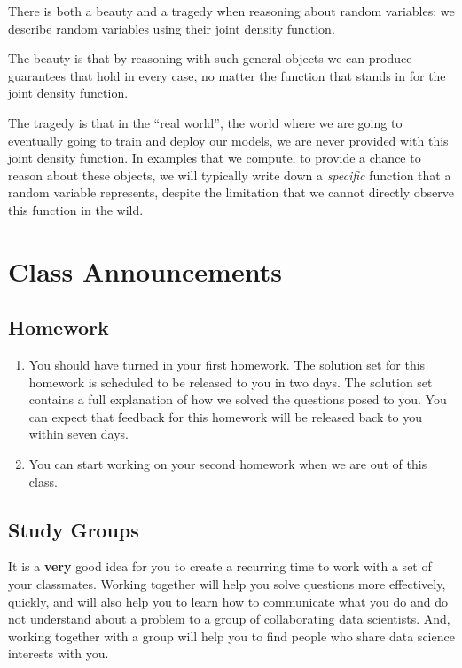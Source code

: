 \documentclass[
]{book}
\providecommand{\tightlist}{%
  \setlength{\itemsep}{0pt}\setlength{\parskip}{0pt}}
\theoremstyle{definition}
\theoremstyle{definition}
\theoremstyle{definition}
\theoremstyle{definition}
\theoremstyle{remark}
\begin{document}
There is both a beauty and a tragedy when reasoning about random variables: we describe random variables using their joint density function.

The beauty is that by reasoning with such general objects we can produce guarantees that hold in every case, no matter the function that stands in for the joint density function.

The tragedy is that in the ``real world'', the world where we are going to eventually going to train and deploy our models, we are never provided with this joint density function. In examples that we compute, to provide a chance to reason about these objects, we will typically write down a \emph{specific} function that a random variable represents, despite the limitation that we cannot directly observe this function in the wild.

\hypertarget{class-announcements}{%
\section{Class Announcements}\label{class-announcements}}

\hypertarget{homework}{%
\subsection{Homework}\label{homework}}

\begin{enumerate}
\def\labelenumi{\arabic{enumi}.}
\tightlist
\item
  You should have turned in your first homework. The solution set for this homework is scheduled to be released to you in two days. The solution set contains a full explanation of how we solved the questions posed to you. You can expect that feedback for this homework will be released back to you within seven days.
\item
  You can start working on your second homework when we are out of this class.
\end{enumerate}

\hypertarget{study-groups}{%
\subsection{Study Groups}\label{study-groups}}

It is a \textbf{very} good idea for you to create a recurring time to work with a set of your classmates. Working together will help you solve questions more effectively, quickly, and will also help you to learn how to communicate what you do and do not understand about a problem to a group of collaborating data scientists. And, working together with a group will help you to find people who share data science interests with you.
\end{document}
